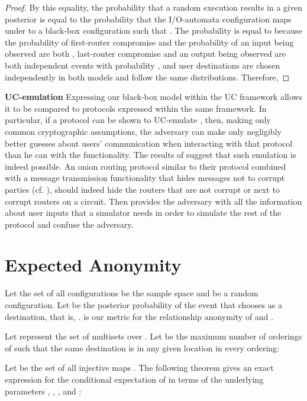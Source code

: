 \documentclass[prodmode,acmtissec]{acmsmall}
\begin{document}
\begin{proof}
By this equality, the probability that a random execution  results in a given posterior  is equal to the probability that the I/O-automata configuration  maps under  to a black-box configuration  such that .  The probability  is equal to  because the probability of first-router compromise and the probability of an input being observed are both , last-router compromise and an output being observed are both independent events with probability , and user destinations are chosen independently in both models and follow the same distributions.  Therefore,

\end{proof}

{\bf UC-emulation}
Expressing our black-box model within the UC framework allows it to be compared to protocols expressed within the same framework. In particular, if a protocol can be shown to UC-emulate , then, making only common cryptographic assumptions, the adversary can make only negligibly better guesses about users' communication when interacting with that protocol than he can with the functionality. The results of  suggest that such emulation is indeed possible. An onion routing protocol similar to their protocol combined with a message transmission functionality that hides messages not to corrupt parties (cf. ), should indeed hide the routers that are not corrupt or next to corrupt routers on a circuit. Then  provides the adversary with all the information about user inputs that a simulator needs in order to simulate the rest of the protocol and confuse the adversary.

\section{Expected Anonymity} \label{sec:expanon}
Let the set  of all configurations be the sample space and  be a random configuration. Let  be the posterior probability of the event that  chooses  as a destination, that is, .   is our metric for the relationship anonymity of  and .

Let  represent the set of multisets over .  Let  be the maximum number of orderings of  such that the same destination is in any given location in every ordering:


Let  be the set of all injective maps .  The following theorem gives an exact expression for the conditional expectation of  in terms of the underlying parameters , , , and :
\end{document}
